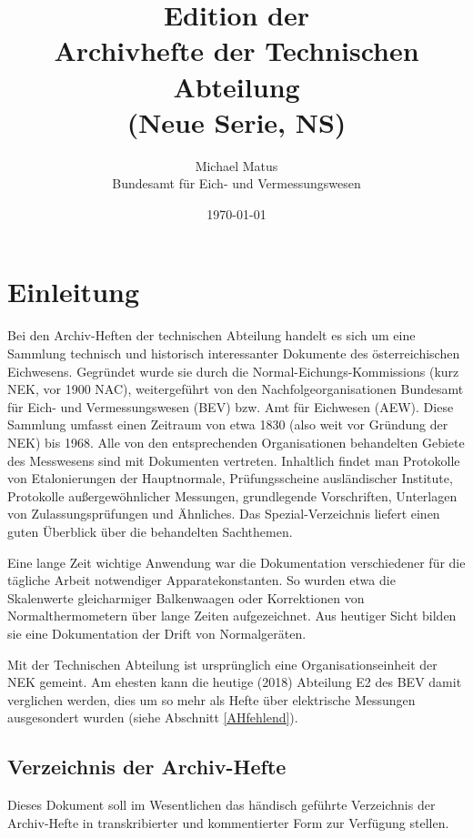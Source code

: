\documentclass[a4paper]{scrbook}
\title{Edition der\\Archivhefte der Technischen Abteilung\\(Neue Serie, NS)}
\date{\today}
\author{Michael Matus \\ Bundesamt für Eich- und Vermessungswesen}
\begin{document}
\maketitle
\tableofcontents

\parindent0pt

\chapter{Einleitung}

Bei den \glqq Archiv-Heften der technischen Abteilung\grqq{} handelt es sich um eine Sammlung technisch und historisch interessanter Dokumente des öster\-reichi\-schen Eichwesens. Gegründet wurde sie durch die Normal-Eichungs-Komm\-iss\-ions (kurz NEK, vor 1900 NAC), weitergeführt von den Nachfolgeorganisationen Bundesamt für Eich- und Vermessungswesen (BEV) bzw. Amt für Eichwesen (AEW). Diese Sammlung umfasst einen Zeitraum von etwa 1830 (also weit vor Gründung der NEK) bis 1968. Alle von den entsprechenden Organisationen behandelten Gebiete des Messwesens sind mit Dokumenten vertreten. Inhaltlich findet man Protokolle von Etalonierungen der Hauptnormale, Prüfungsscheine ausländischer Institute, Protokolle außergewöhnlicher Messungen, grundlegende Vorschriften, Unterlagen von Zulassungsprüfungen und Ähnliches. Das Spezial-Verzeichnis liefert einen guten Überblick über die behandelten Sachthemen.

Eine lange Zeit wichtige Anwendung war die Dokumentation verschiedener für die tägliche Arbeit notwendiger Apparatekonstanten. So wurden etwa die Skalenwerte gleicharmiger Balkenwaagen oder Korrektionen von Normalthermometern über lange Zeiten aufgezeichnet. Aus heutiger Sicht bilden sie eine Dokumentation der Drift von Normalgeräten.

Mit der \glqq Technischen Abteilung\grqq{} ist ursprünglich eine Organisationseinheit der NEK gemeint. Am ehesten kann die heutige (2018) Abteilung E2 des BEV damit verglichen werden, dies um so mehr als Hefte über elektrische Messungen ausgesondert wurden (siehe Abschnitt \ref{AHfehlend}).

\section{Verzeichnis der Archiv-Hefte}

Dieses Dokument soll im Wesentlichen das händisch geführte Verzeichnis der Archiv-Hefte in transkribierter und kommentierter Form zur Verfügung stellen. 
\end{document}
